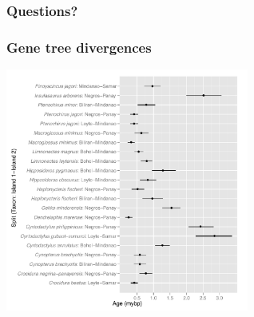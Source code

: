 {
\begin{frame}
    \frametitle{Questions?}    
\end{frame}
}


\begin{frame}[noframenumbering]
    \frametitle{Gene tree divergences}
    \centerline{
    \includegraphics[height=8cm]{../images/gene_splits.pdf}}
\end{frame}


